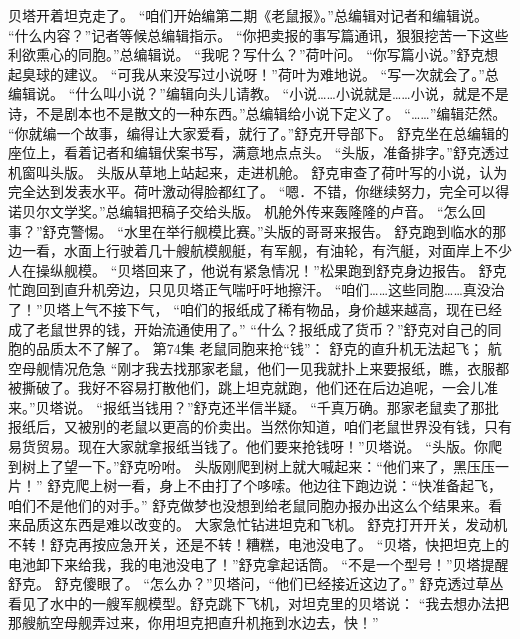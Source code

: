 \documentclass[a4paper,12pt,UTF8,twoside]{ctexbook}
\begin{document}
        贝塔开着坦克走了。 
        “咱们开始编第二期《老鼠报》。”总编辑对记者和编辑说。 
        “什么内容？”记者等候总编辑指示。 
        “你把卖报的事写篇通讯，狠狠挖苦一下这些利欲熏心的同胞。”总编辑说。 
        “我呢？写什么？”荷叶问。 
        “你写篇小说。”舒克想起臭球的建议。 
        “可我从来没写过小说呀！”荷叶为难地说。 
        “写一次就会了。”总编辑说。 
        “什么叫小说？”编辑向头儿请教。 
        “小说……小说就是……小说，就是不是诗，不是剧本也不是散文的一种东西。”总编辑给小说下定义了。 
        “……”编辑茫然。 
        “你就编一个故事，编得让大家爱看，就行了。”舒克开导部下。 
        舒克坐在总编辑的座位上，看着记者和编辑伏案书写，满意地点点头。 
        “头版，准备排字。”舒克透过机窗叫头版。 
        头版从草地上站起来，走进机舱。 
        舒克审查了荷叶写的小说，认为完全达到发表水平。荷叶激动得脸都红了。 
        “嗯．不错，你继续努力，完全可以得诺贝尔文学奖。”总编辑把稿子交给头版。 
        机舱外传来轰隆隆的卢音。 
        “怎么回事？”舒克警惕。 
        “水里在举行舰模比赛。”头版的哥哥来报告。 
        舒克跑到临水的那边一看，水面上行驶着几十艘航模舰艇，有军舰，有油轮，有汽艇，对面岸上不少人在操纵舰模。 
        “贝塔回来了，他说有紧急情况！”松果跑到舒克身边报告。 
        舒克忙跑回到直升机旁边，只见贝塔正气喘吁吁地擦汗。 
        “咱们……这些同胞……真没治了！”贝塔上气不接下气，  “咱们的报纸成了稀有物品，身价越来越高，现在已经成了老鼠世界的钱，开始流通使用了。” 
        “什么？报纸成了货币？”舒克对自己的同胞的品质太不了解了。   第74集 
        老鼠同胞来抢“钱”： 
        舒克的直升机无法起飞； 
        航空母舰情况危急   
        “刚才我去找那家老鼠，他们一见我就扑上来要报纸，瞧，衣服都被撕破了。我好不容易打散他们，跳上坦克就跑，他们还在后边追呢，一会儿准来。”贝塔说。 
        “报纸当钱用？”舒克还半信半疑。 
        “千真万确。那家老鼠卖了那批报纸后，又被别的老鼠以更高的价卖出。当然你知道，咱们老鼠世界没有钱，只有易货贸易。现在大家就拿报纸当钱了。他们要来抢钱呀！”贝塔说。 
        “头版。你爬到树上了望一下。”舒克吩咐。 
        头版刚爬到树上就大喊起来：“他们来了，黑压压一片！” 
        舒克爬上树一看，身上不由打了个哆嗦。他边往下跑边说：“快准备起飞，咱们不是他们的对手。” 
        舒克做梦也没想到给老鼠同胞办报办出这么个结果来。看来品质这东西是难以改变的。 
        大家急忙钻进坦克和飞机。 
        舒克打开开关，发动机不转！舒克再按应急开关，还是不转！糟糕，电池没电了。 
        “贝塔，快把坦克上的电池卸下来给我，我的电池没电了！”舒克拿起话筒。 
        “不是一个型号！”贝塔提醒舒克。 
        舒克傻眼了。 
        “怎么办？”贝塔问，“他们已经接近这边了。” 
        舒克透过草丛看见了水中的一艘军舰模型。舒克跳下飞机，对坦克里的贝塔说： 
        “我去想办法把那艘航空母舰弄过来，你用坦克把直升机拖到水边去，快！” 
\end{document}

